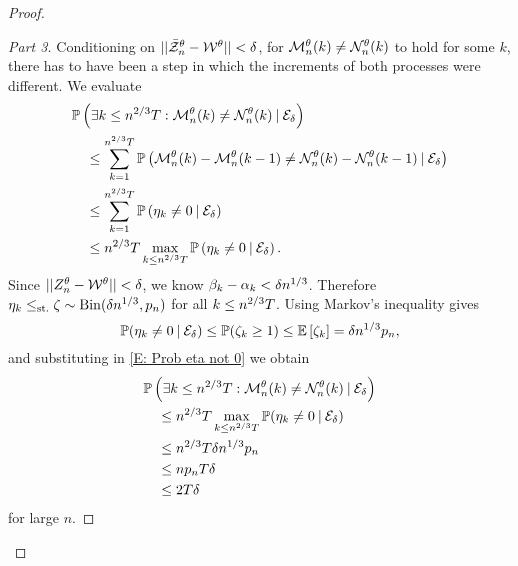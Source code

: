 \begin{proof}
\begin{proof}[Part 3]
Conditioning on $||\bar{\mathcal{Z}}^{\theta}_n - \mathcal{W}^{\theta}|| < \delta$, for $\mathcal{M}_n^{\theta}(k) \neq \mathcal{N}_n^{\theta}(k)$ to hold for some $k$,
there has to have been a step in which the increments of both processes were different.
We evaluate
\begin{equation} \label{E: Prob eta not 0}
\begin{aligned}
&\mathbb{P}\left(\exists k\leq n^{2 / 3}T: \mathcal{M}_n^{\theta}(k) \neq \mathcal{N}_n^{\theta}(k) \: | \: \mathcal{E}_{\delta}\right) \\
&\quad \leq \sum_{k=1}^{n^{2 / 3}T} \mathbb{P}\left( \mathcal{M}_n^{\theta}(k) - \mathcal{M}_n^{\theta}(k-1) \neq \mathcal{N}_n^{\theta}(k) - \mathcal{N}_n^{\theta}(k-1) \: | \: \mathcal{E}_{\delta}\right) \\
&\quad \leq \sum_{k=1}^{n^{2 / 3}T} \mathbb{P}\left( \eta_k \neq 0 \: | \: \mathcal{E}_{\delta}\right) \\
&\quad \leq n^{2 / 3}T \max_{k \leq n^{2 / 3}T} \mathbb{P}\left(\eta_k \neq 0 \: | \: \mathcal{E}_{\delta}\right).
\end{aligned}
\end{equation}
Since $||Z_n^{\theta} - \mathcal{W}^{\theta}|| < \delta$, we know $\beta_k - \alpha_k < \delta n^{1 / 3}$. Therefore
$\eta_k \leq_{\text{st.}} \zeta \sim \operatorname*{Bin}(\delta n^{1 / 3}, p_n)$ for all $k \leq n^{2 / 3}T$.
Using Markov's inequality gives
\begin{equation*}
\mathbb{P}( \eta_k \neq 0 \: | \: \mathcal{E}_{\delta} ) \leq \mathbb{P}( \zeta_k \geq 1 ) \leq \mathbb{E} \left[ \zeta_k \right] = \delta n^{1 / 3}p_n,
\end{equation*}
and substituting in \eqref{E: Prob eta not 0} we obtain
\begin{equation*}
\begin{aligned}
&\mathbb{P}\left(\exists k\leq n^{2 / 3}T: \mathcal{M}_n^{\theta}(k) \neq \mathcal{N}_n^{\theta}(k) \: | \: \mathcal{E}_{\delta}\right) \\
&\quad \leq n^{2 / 3}T \max_{k \leq n^{2 / 3}T} \mathbb{P}( \eta_k \neq 0 \: | \: \mathcal{E}_{\delta} ) \\
&\quad \leq n^{2 / 3}T\delta n^{1 / 3}p_n \\
&\quad \leq n p_n T \delta \\
&\quad \leq 2T\delta 
\end{aligned}
\end{equation*}
for large $n$.


\end{proof}
\end{proof}
